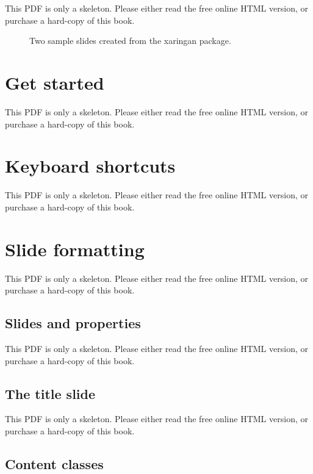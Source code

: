 \documentclass[
  11pt,
]{krantz}
\theoremstyle{definition}
\theoremstyle{definition}
\theoremstyle{definition}
\theoremstyle{definition}
\theoremstyle{remark}
\begin{document}
This PDF is only a skeleton. Please either read the free online HTML version, or purchase a hard-copy of this book.

\begin{figure}\caption{Two sample slides created from the xaringan package.}\end{figure}

\section{Get started}\label{xaringan-start}

This PDF is only a skeleton. Please either read the free online HTML version, or purchase a hard-copy of this book.

\section{Keyboard shortcuts}\label{xaringan-key}

This PDF is only a skeleton. Please either read the free online HTML version, or purchase a hard-copy of this book.

\section{Slide formatting}\label{xaringan-format}

This PDF is only a skeleton. Please either read the free online HTML version, or purchase a hard-copy of this book.

\subsection{Slides and properties}\label{slides-and-properties}

This PDF is only a skeleton. Please either read the free online HTML version, or purchase a hard-copy of this book.

\subsection{The title slide}\label{the-title-slide}

This PDF is only a skeleton. Please either read the free online HTML version, or purchase a hard-copy of this book.

\subsection{Content classes}\label{content-classes}
\end{document}

